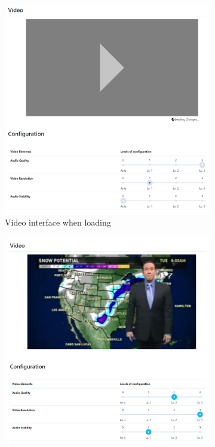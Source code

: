 \begin{figure}
     \centering
     \begin{subfigure}[ht]{0.49\textwidth}
         \centering
         \includegraphics[width=\textwidth]{content/image/player_loading.png}
         \caption{Video interface when loading}
         \label{fig:video_loading}
     \end{subfigure}
     \hfill
     \begin{subfigure}[ht]{0.49\textwidth}
         \centering
         \includegraphics[width=\textwidth]{content/image/player.png}

\end{subfigure}
\end{figure}
